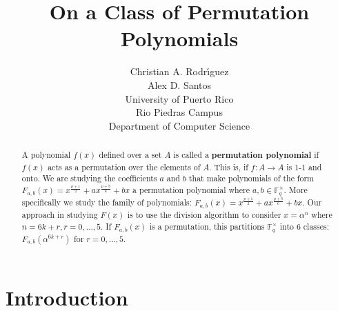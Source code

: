 \documentclass[12pt]{article}
\title{On a Class of Permutation Polynomials}
\author{Christian A. Rodr\'{\i}guez \\ Alex D. Santos \\ University of Puerto Rico \\ Rio Piedras Campus \\ Department of Computer Science}
\date{}
\begin{document}
\maketitle

\begin{abstract}

A polynomial $f(x)$ defined over a set $A$ is called a \textbf{permutation polynomial} if $f(x)$ acts as a permutation over the elements of $A$. This is, if $f: A \rightarrow A$ is 1-1 and onto. We are studying the coefficients $a$ and $b$ that make polynomials of the form $F_{a,b}(x)=x^{\frac{p+1}{2}} + ax^{\frac{p+5}{6}} + bx$ a permutation polynomial where $a,b \in \mathbb{F}_{q}^{\times}$. More specifically we study the family of polynomials: $F_{a,b}(x)=x^{\frac{p+1}{2}} + ax^{\frac{p+5}{6}} + bx$. Our approach in studying $F(x)$ is to use the division algorithm to consider $x=\alpha^{n}$ where $n=6k+r, r=0,...,5$. If $F_{a,b}(x)$ is a permutation, this partitions $\mathbb{F}_{q}^{\times}$ into 6 classes: $F_{a,b}(\alpha^{6k+r})$ for $r=0,...,5$.

\end{abstract}

\section{Introduction}\label{intro}
\end{document}
